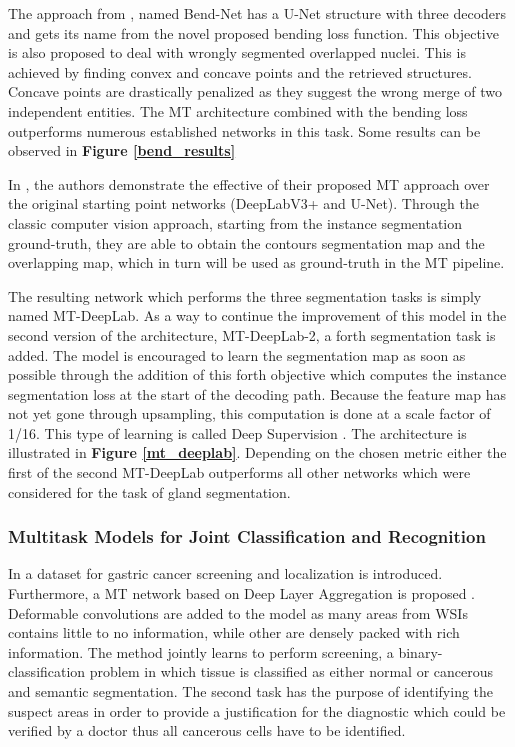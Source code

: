 \documentclass[conference]{IEEEtran}
\begin{document}
The approach from \cite{wang2021bend}, named Bend-Net has a U-Net \cite{ronneberger2015u} structure with three decoders and gets its name from the novel proposed bending loss function. This objective is also proposed to deal with wrongly segmented overlapped nuclei. This is achieved by finding convex and concave points and the retrieved structures. Concave points are drastically penalized as they suggest the wrong merge of two independent entities. The MT architecture combined with the bending loss outperforms numerous established networks in this task. Some results can be observed in \textbf{Figure \ref{bend_results}}

In \cite{rezazadeh2023multi}, the authors demonstrate the effective of their proposed MT approach over the original starting point networks (DeepLabV3+ \cite{chen2018encoder} and U-Net). Through the classic computer vision approach, starting from the instance segmentation ground-truth, they are able to obtain the contours segmentation map and the overlapping map, which in turn will be used as ground-truth in the MT pipeline. 

The resulting network which performs the three segmentation tasks is simply named MT-DeepLab. As a way to continue the improvement of this model in the second version of the architecture, MT-DeepLab-2, a forth segmentation task is added. The model is encouraged to learn the segmentation map as soon as possible through the addition of this forth objective which computes the instance segmentation loss at the start of the decoding path. Because the feature map has not yet gone through upsampling, this computation is done at a scale factor of 1/16. This type of learning is called Deep Supervision \cite{lee2015deeply}. The architecture is illustrated in \textbf{Figure \ref{mt_deeplab}}. Depending on the chosen metric either the first of the second MT-DeepLab outperforms all other networks which were considered for the task of gland segmentation.

\subsubsection{Multitask Models for Joint Classification and Recognition}
\label{class_recog_mt}

In \cite{yu2021large} a dataset for gastric cancer screening and localization is introduced. Furthermore, a MT network based on Deep Layer Aggregation is proposed \cite{yu2018deep}. Deformable convolutions \cite{dai2017deformable} are added to the model as many areas from WSIs contains little to no information, while other are densely packed with rich information. The method jointly learns to perform screening, a binary-classification problem in which tissue is classified as either normal or cancerous and semantic segmentation. The second task has the purpose of identifying the suspect areas in order to provide a justification for the diagnostic which could be verified by a doctor thus all cancerous cells have to be identified. 
\end{document}

